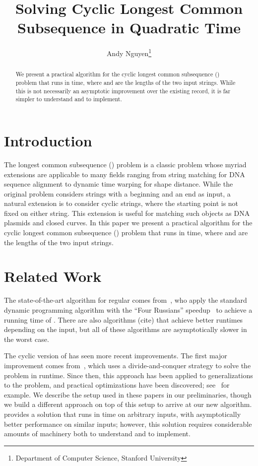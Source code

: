 \documentclass{article}
\title{Solving Cyclic Longest Common Subsequence in Quadratic Time}
\author{Andy Nguyen\thanks{Department of Computer Science, Stanford University}}
\begin{document}

\maketitle

\begin{abstract}
We present a practical algorithm for the cyclic longest common subsequence () problem that runs in  time, where  and  are the lengths of the two input strings.  While this is not necessarily an asymptotic improvement over the existing record, it is far simpler to understand and to implement.
\end{abstract}

\section{Introduction}
The longest common subsequence () problem is a classic problem whose myriad extensions are applicable to many fields ranging from string matching for DNA sequence alignment to dynamic time warping for shape distance.  While the original problem considers strings with a beginning and an end as input, a natural extension is to consider cyclic strings, where the starting point is not fixed on either string.  This extension is useful for matching such objects as DNA plasmids and closed curves.  In this paper we present a practical algorithm for the cyclic longest common subsequence () problem that runs in  time, where  and  are the lengths of the two input strings.

\section{Related Work}
The state-of-the-art algorithm for regular  comes from~\cite{MP80}, who apply the standard dynamic programming algorithm with the ``Four Russians'' speedup~\cite{ADKF70} to achieve a running time of .  There are also algorithms (cite) that achieve better runtimes depending on the input, but all of these algorithms are asymptotically slower in the worst case.

The cyclic version of  has seen more recent improvements.  The first major improvement comes from~\cite{M90}, which uses a divide-and-conquer strategy to solve the problem in  runtime.  Since then, this approach has been applied to generalizations to the problem, and practical optimizations have been discovered; see~\cite{SFC07} for example.  We describe the setup used in these papers in our preliminaries, though we build a different approach on top of this setup to arrive at our new algorithm. \cite{LMS98} provides a solution that runs in  time on arbitrary inputs, with asymptotically better performance on similar inputs; however, this solution requires considerable amounts of machinery both to understand and to implement.
\end{document}
